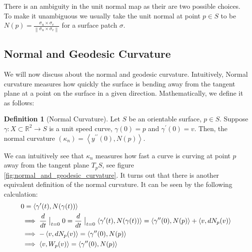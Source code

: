 \documentclass{article}
\theoremstyle{plain}
\theoremstyle{definition}
\newtheorem{definition}{Definition}
\theoremstyle{remark}
\newcommand{\R}{\mathbb{R}}
\begin{document}
There is an ambiguity in the unit normal map as their are two possible choices. To make it unambiguous we usually take the unit normal at point \(p \in S\) to be \( N(p) = \frac{\sigma_u \times \sigma_v}{\left\lVert \sigma_u \times \sigma_v\right\rVert } \) for a surface patch \( \sigma \).

\subsection{Normal and Geodesic Curvature}
We will now discuss about the normal and geodesic curvature. Intuitively, Normal curvature measures how quickly the surface is bending away from the tangent plane at a point on the surface in a given direction. Mathematically, we define it as follows:

\begin{definition}[Normal Curvature]
    Let \(S\) be an orientable surface, \( p \in S\). Suppose \( \gamma: X \subset \R^2 \rightarrow S\) is a unit speed curve, \( \gamma(0) = p\) and \(\gamma^{\prime}(0) = v\). Then, the normal curvature \(( \kappa_n) = \left\langle y^{\prime \prime}(0), N(p)\right\rangle \).
\end{definition}

We can intuitively see that \(\kappa_n\) measures how fast a curve is curving at point \(p\) away from the tangent plane \(T_pS\), see figure \ref{fig:normal_and_geodesic_curvature}.
It turns out that there is another equivalent definition of the normal curvature. It can be seen by the following calculation:
\begin{align} \label{eq: relating two interpretaion of the normal curvature}
    \begin{split}
        & 0 = \left\langle \gamma^{\prime}(t) , N(\gamma(t)) \right\rangle \\
        & \implies \frac{d}{dt} \bigm|_{t=0} 0  = \frac{d}{dt} \bigm|_{t=0} \left\langle \gamma^{\prime}(t) , N(\gamma(t)) \right\rangle
        = \left\langle \gamma^{\prime \prime}(0), N(p)\right\rangle + \left\langle v, dN_p(v) \right\rangle \\
        & \implies  - \left\langle v, dN_p(v) \right\rangle  = \left\langle \gamma^{\prime \prime}(0), N(p)\right\rangle \\
        & \implies   \left\langle v, W_p(v) \right\rangle = \left\langle \gamma^{\prime \prime}(0), N(p)\right\rangle
    \end{split}
\end{align}
\end{document}
